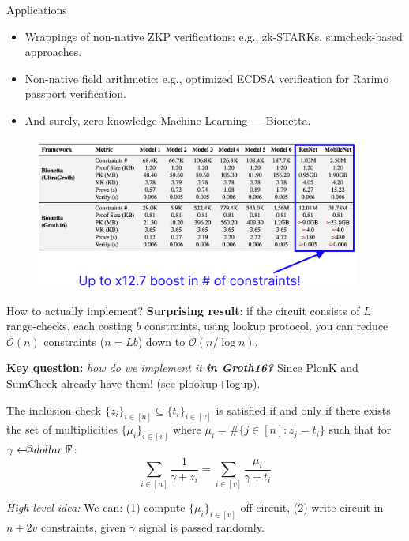 \documentclass{zkdl-presentation-template}
\makeatletter
\newcommand\leftarrowS{\leftarrow\joinrel\smalldollar}
\newcommand{\smalldollar}{\mathrel{\mathpalette\small@dollar\relax}}
\newcommand{\small@dollar}[2]{%
  \vcenter{\hbox{%
    $#1\textnormal{\fontsize{0.7\dimexpr\f@size pt}{0}\selectfont\$}$%
  }}%
}
\makeatother
\begin{document}
    \begin{frame}{Applications}
        \begin{itemize}
            \item Wrappings of non-native ZKP verifications: e.g., zk-STARKs, 
            sumcheck-based approaches.\pause
            \item Non-native field arithmetic: e.g., optimized ECDSA
            verification for Rarimo passport verification.\pause
            \item And surely, zero-knowledge Machine Learning --- Bionetta.
        \end{itemize}
        \begin{figure}
            \centering
            \includegraphics[width=0.95\textwidth]{images/benchmark.png}
        \end{figure}
    \end{frame}

    \begin{frame}{How to actually implement?}
        \textcolor{blue!70!black}{\textbf{Surprising result}}: if the circuit
        consists of $L$ range-checks, each costing $b$ constraints, using lookup
        protocol, you can reduce \textcolor{blue!70!black}{$\mathcal{O}(n)$}
        constraints ($n=Lb$) down to
        \textcolor{blue!70!black}{$\mathcal{O}(n/\log n)$}.\pause

        \textcolor{blue!70!black}{\textbf{Key question:}} \textit{how do we
        implement it \textbf{in Groth16?}} Since PlonK and SumCheck already have
        them! (see plookup+logup).\pause

        \begin{theorem}
            The inclusion check $\{z_i\}_{i \in [n]} \subseteq \{t_i\}_{i \in
            [v]}$ is satisfied if and only if there exists the set of
            multiplicities $\{\mu_i\}_{i \in [v]}$ where $\mu_i = \#\{j \in [n]:
            z_j = t_i\}$ such that for $\gamma \leftarrowS \mathbb{F}$:
            \begin{equation*}
                \sum_{i \in [n]} \frac{1}{\gamma + z_i} = \sum_{i \in [v]} \frac{\mu_i}{\gamma + t_i}
            \end{equation*}
        \end{theorem}

        \pause\textit{High-level idea:} We can: (1) compute $\{\mu_i\}_{i \in [v]}$
        off-circuit, (2) write circuit in $n+2v$ constraints,
        \textcolor{red!70!black}{given $\gamma$ signal is passed randomly}.
    \end{frame}
\end{document}
